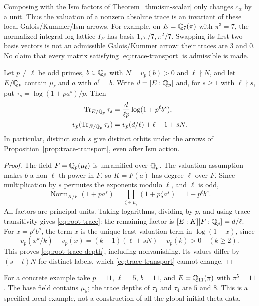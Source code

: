 Composing with the Ism factors of Theorem~\ref{thm:ism-scalar} only
changes $c_\alpha$ by a unit. Thus the valuation of a nonzero absolute
trace is an invariant of these local Galois/Kummer/Ism arrows.
For example, on $E=\mathbb Q_7(\pi)$ with $\pi^3=7$, the normalized integral
log lattice $I_E$ has basis $1,\pi/7,\pi^2/7$. Swapping its first two basis vectors is
not an admissible Galois/Kummer arrow: their traces are $3$ and $0$.
No claim that every matrix satisfying \eqref{eq:trace-transport} is
admissible is made.

\begin{theorem}\label{thm:root-trace}
Let $p\ne\ell$ be odd primes, $b\in\mathbb Q_p$ with
$N=v_p(b)>0$ and $\ell\nmid N$, and let $E/\mathbb Q_p$ contain
$\mu_\ell$ and $a$ with $a^\ell=b$. Write $d=[E:\mathbb Q_p]$ and, for
$s\ge1$ with $\ell\nmid s$, put $\tau_s=\log(1+pa^s)/p$. Then
\begin{align}
 \operatorname{Tr}_{E/\mathbb Q_p}\tau_s
   &=\frac{d}{\ell p}\log(1+p^\ell b^s),\label{eq:root-trace}\\
 v_p(\operatorname{Tr}_{E/\mathbb Q_p}\tau_s)
   &=v_p(d/\ell)+\ell-1+sN.\label{eq:root-trace-depth}
\end{align}
In particular, distinct such $s$ give distinct orbits under the arrows
of Proposition~\ref{prop:trace-transport}, even after Ism action.
\end{theorem}
\begin{proof}
The field $F=\mathbb Q_p(\mu_\ell)$ is unramified over $\mathbb Q_p$.
The valuation assumption makes $b$ a non-$\ell$-th-power in $F$, so
$K=F(a)$ has degree $\ell$ over $F$. Since multiplication by $s$
permutes the exponents modulo $\ell$, and $\ell$ is odd,
\[
 \operatorname{Norm}_{K/F}(1+pa^s)
   =\prod_{\zeta\in\mu_\ell}(1+p\zeta a^s)=1+p^\ell b^s.
\]
All factors are principal units. Taking logarithms, dividing by $p$,
and using trace transitivity gives \eqref{eq:root-trace}: the remaining
factor is $[E:K][F:\mathbb Q_p]=d/\ell$.
For $x=p^\ell b^s$, the term $x$ is the unique least-valuation term
in $\log(1+x)$, since
\[
 v_p(x^k/k)-v_p(x)=(k-1)(\ell+sN)-v_p(k)>0\quad(k\ge2).
\]
This proves \eqref{eq:root-trace-depth}, including nonvanishing.
Its values differ by $(s-t)N$ for distinct labels, which
\eqref{eq:trace-transport} cannot change.
\end{proof}

For a concrete example take $p=11$, $\ell=5$, $b=11$, and
$E=\mathbb Q_{11}(\pi)$ with $\pi^5=11$. The base field contains $\mu_5$;
the trace depths of $\tau_1$ and $\tau_4$ are $5$ and $8$.
This is a specified local example, not a construction of all the
global initial theta data.

